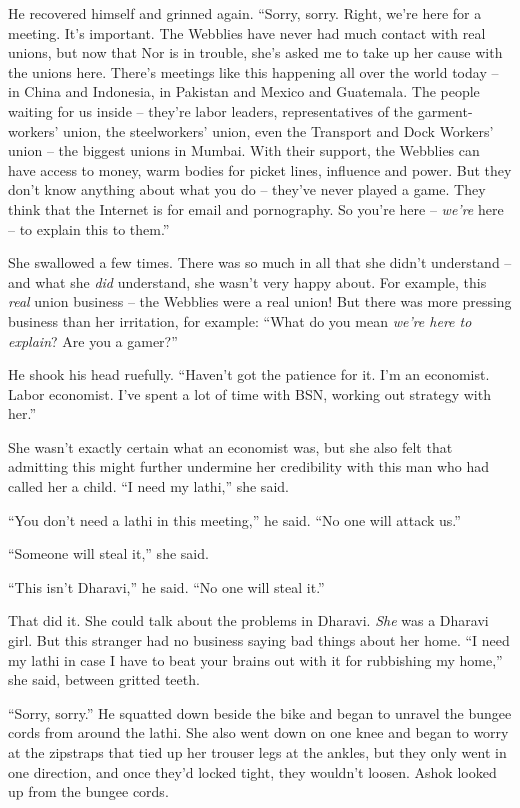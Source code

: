 He recovered himself and grinned again. ``Sorry, sorry. Right, we're
here for a meeting. It's important. The Webblies have never had
much contact with real unions, but now that Nor is in trouble,
she's asked me to take up her cause with the unions here. There's
meetings like this happening all over the world today -- in China
and Indonesia, in Pakistan and Mexico and Guatemala. The people
waiting for us inside -- they're labor leaders, representatives of
the garment-workers' union, the steelworkers' union, even the
Transport and Dock Workers' union -- the biggest unions in Mumbai.
With their support, the Webblies can have access to money, warm
bodies for picket lines, influence and power. But they don't know
anything about what you do -- they've never played a game. They
think that the Internet is for email and pornography. So you're
here -- \emph{we're} here -- to explain this to them.''

She swallowed a few times. There was so much in all that she didn't
understand -- and what she \emph{did} understand, she wasn't very
happy about. For example, this \emph{real} union business -- the
Webblies were a real union! But there was more pressing business
than her irritation, for example: ``What do you mean
\emph{we're here to explain}? Are you a gamer?''

He shook his head ruefully. ``Haven't got the patience for it. I'm
an economist. Labor economist. I've spent a lot of time with BSN,
working out strategy with her.''

She wasn't exactly certain what an economist was, but she also felt
that admitting this might further undermine her credibility with
this man who had called her a child. ``I need my lathi,'' she said.

``You don't need a lathi in this meeting,'' he said. ``No one will
attack us.''

``Someone will steal it,'' she said.

``This isn't Dharavi,'' he said. ``No one will steal it.''

That did it. She could talk about the problems in Dharavi.
\emph{She} was a Dharavi girl. But this stranger had no business
saying bad things about her home. ``I need my lathi in case I have
to beat your brains out with it for rubbishing my home,'' she said,
between gritted teeth.

``Sorry, sorry.'' He squatted down beside the bike and began to
unravel the bungee cords from around the lathi. She also went down
on one knee and began to worry at the zipstraps that tied up her
trouser legs at the ankles, but they only went in one direction,
and once they'd locked tight, they wouldn't loosen. Ashok looked up
from the bungee cords.

